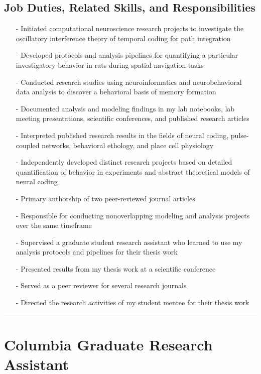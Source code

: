 \documentclass[10pt]{article}
\begin{document}
\subsection*{Job Duties, Related Skills, and Responsibilities}

\begin{itemize}
  \item[-] Initiated computational neuroscience research projects to investigate the oscillatory interference theory of temporal coding for path integration
  \item[-] Developed protocols and analysis pipelines for quantifying a particular investigatory behavior in rats during spatial navigation tasks
  \item[-] Conducted research studies using neuroinformatics and neurobehavioral data analysis to discover a behavioral basis of memory formation
  \item[-] Documented analysis and modeling findings in my lab notebooks, lab meeting presentations, scientific conferences, and published research articles
  \item[-] Interpreted published research results in the fields of neural coding, pulse-coupled networks, behavioral ethology, and place cell physiology
  \item[-] Independently developed distinct research projects based on detailed quantification of behavior in experiments and abstract theoretical models of neural coding
  \item[-] Primary authorship of two peer-reviewed journal articles
  \item[-] Responsible for conducting nonoverlapping modeling and analysis projects over the same timeframe
  \item[-] Supervised a graduate student research assistant who learned to use my analysis protocols and pipelines for their thesis work
  \item[-] Presented results from my thesis work at a scientific conference
  \item[-] Served as a peer reviewer for several research journals
  \item[-] Directed the research activities of my student mentee for their thesis work
\end{itemize}



\pagebreak
\hrule
\section{Columbia Graduate Research Assistant}
\label{sec:job4}
\end{document}
